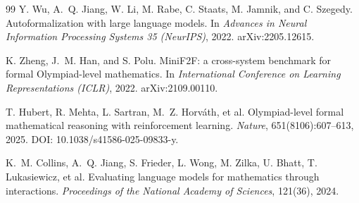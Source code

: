 \documentclass[11pt]{article}
\theoremstyle{definition}
\theoremstyle{plain}
\theoremstyle{remark}
\begin{document}
\begin{thebibliography}{99}
Y. Wu, A.~Q. Jiang, W. Li, M. Rabe, C. Staats, M. Jamnik, and C. Szegedy.
Autoformalization with large language models.
In \emph{Advances in Neural Information Processing Systems 35 (NeurIPS)}, 2022.
arXiv:2205.12615.

K. Zheng, J.~M. Han, and S. Polu.
MiniF2F: a cross-system benchmark for formal Olympiad-level mathematics.
In \emph{International Conference on Learning Representations (ICLR)}, 2022.
arXiv:2109.00110.

T. Hubert, R. Mehta, L. Sartran, M.~Z. Horv\'ath, et al.
Olympiad-level formal mathematical reasoning with reinforcement learning.
\emph{Nature}, 651(8106):607--613, 2025. DOI: 10.1038/s41586-025-09833-y.

K.~M. Collins, A.~Q. Jiang, S. Frieder, L. Wong, M. Zilka, U. Bhatt, T. Lukasiewicz, et al.
Evaluating language models for mathematics through interactions.
\emph{Proceedings of the National Academy of Sciences}, 121(36), 2024.

\end{thebibliography}
\end{document}
